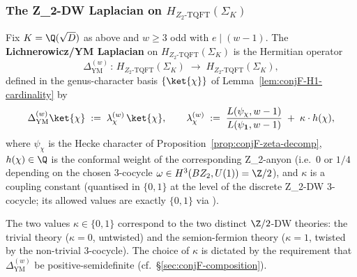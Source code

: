 \subsubsection{The Z_2-DW Laplacian on $H_{Z_2\text{-TQFT}}(\Sigma_K)$}
\label{sec:conjF-DW-laplacian}

\begin{definition}\label{def:conjF-lichn-operator}
Fix $K = \Q(\sqrt D)$ as above and $w \ge 3$ odd with $e \mid (w-1)$.
The {\bf Lichnerowicz/YM Laplacian} on
$H_{Z_2\text{-}\mathrm{TQFT}}(\Sigma_K)$ is the Hermitian operator
\[
   \Delta_{\mathrm{YM}}^{(w)} \,\colon\,
   H_{Z_2\text{-}\mathrm{TQFT}}(\Sigma_K) \;\to\;
   H_{Z_2\text{-}\mathrm{TQFT}}(\Sigma_K),
\]
defined in the genus-character basis $\{\ket{\chi}\}$ of
Lemma~\ref{lem:conjF-H1-cardinality} by
\begin{equation}\label{eq:conjF-Delta-YM-def}
   \Delta_{\mathrm{YM}}^{(w)} \ket{\chi} \;:=\;
   \lambda_\chi^{(w)} \, \ket{\chi},
   \qquad
   \lambda_\chi^{(w)} \;:=\;
   \frac{L(\psi_\chi, w-1)}{L(\psi_{\mathbf{1}}, w-1)}
   \;+\;
   \kappa \cdot h(\chi),
\end{equation}
where $\psi_\chi$ is the Hecke character of
Proposition~\ref{prop:conjF-zeta-decomp}, $h(\chi) \in \Q$ is the
conformal weight of the corresponding Z_2-anyon (i.e.\
$0$ or $1/4$ depending on the chosen 3-cocycle $\omega \in
H^3(BZ_2, U(1)) = \Z/2$), and $\kappa$ is a coupling constant
(quantised in $\{0, 1\}$ at the level of the discrete Z_2-DW
3-cocycle; its allowed values are exactly $\{0, 1\}$ via
\cite[\S6]{DijkgraafWitten1990}).
\end{definition}

\begin{remark}\label{rk:conjF-cocycle}
The two values $\kappa \in \{0, 1\}$ correspond to the two distinct
$\Z/2$-DW theories: the trivial theory ($\kappa = 0$, untwisted) and
the semion-fermion theory ($\kappa = 1$, twisted by the non-trivial
3-cocycle).  The choice of $\kappa$ is dictated by the requirement
that $\Delta_{\mathrm{YM}}^{(w)}$ be positive-semidefinite (cf.\
\S\ref{sec:conjF-composition}).
\end{remark}

